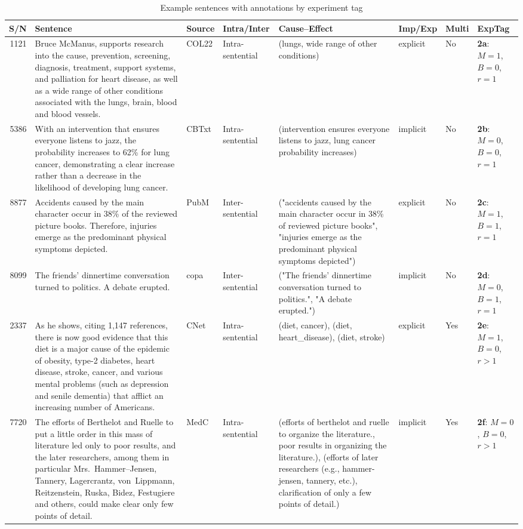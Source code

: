 \documentclass[conference]{IEEEtran}
\begin{document}
\begin{table}[t]
  \centering
  \setlength{\tabcolsep}{3pt}
  \caption{Example sentences with annotations by experiment tag}
  \label{app:tab:example2}
  \begin{tabular}{r |p{5cm}| p{1cm} |p{1.5cm}| p{4cm} |p{1.5cm}| p{1.2cm}| p{1.2cm}|}
    \toprule
    S/N & Sentence & Source & Intra/Inter & Cause--Effect & Imp/Exp & Multi & ExpTag \\
    \midrule
    1121 & Bruce McManus, supports research into the cause, prevention, screening, diagnosis, treatment, support systems, and palliation for heart disease, as well as a wide range of other conditions associated with the lungs, brain, blood and blood vessels. & COL22 & Intra-sentential & (lungs, wide range of other conditions) & explicit & No & \textbf{2a}: $M=1$, $B=0$, $r=1$ \\ \hline
    5386 & With an intervention that ensures everyone listens to jazz, the probability increases to 62\% for lung cancer, demonstrating a clear increase rather than a decrease in the likelihood of developing lung cancer. & CBTxt & Intra-sentential & (intervention ensures everyone listens to jazz, lung cancer probability increases) & implicit & No & \textbf{2b}: $M=0$, $B=0$, $r=1$ \\ \hline
    8877 & Accidents caused by the main character occur in 38\% of the reviewed picture books. Therefore, injuries emerge as the predominant physical symptoms depicted. & PubM & Inter-sentential & ("accidents caused by the main character occur in 38\% of reviewed picture books", "injuries emerge as the predominant physical symptoms depicted") & explicit & No & \textbf{2c}: $M=1$, $B=1$, $r=1$ \\ \hline
    8099 & The friends' dinnertime conversation turned to politics. A debate erupted. & copa & Inter-sentential & ("The friends' dinnertime conversation turned to politics.", "A debate erupted.") & implicit & No & \textbf{2d}: $M=0$, $B=1$, $r=1$ \\ \hline
    2337 & As he shows, citing 1,147 references, there is now good evidence that this diet is a major cause of the epidemic of obesity, type-2 diabetes, heart disease, stroke, cancer, and various mental problems (such as depression and senile dementia) that afflict an increasing number of Americans. & CNet & Intra-sentential & (diet, cancer), (diet, heart\_disease), (diet, stroke) & explicit & Yes & \textbf{2e}: $M=1$, $B=0$, $r>1$ \\ \hline
    7720 & The efforts of Berthelot and Ruelle to put a little order in this mass of literature led only to poor results, and the later researchers, among them in particular Mrs.~Hammer--Jensen, Tannery, Lagercrantz, von~Lippmann, Reitzenstein, Ruska, Bidez, Festugiere and others, could make clear only few points of detail. & MedC & Intra-sentential & (efforts of berthelot and ruelle to organize the literature., poor results in organizing the literature.), (efforts of later researchers (e.g., hammer-jensen, tannery, etc.), clarification of only a few points of detail.) & implicit & Yes & \textbf{2f}: $M=0$, $B=0$, $r>1$ \\ \hline

\end{tabular}
\end{table}
\end{document}
